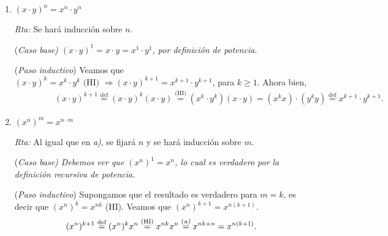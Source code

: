 \documentclass[12pt,spanish,makeidx]{amsbook}
\newcommand{\rta}{\noindent\textit{Rta: }}
\begin{document}
\begin{enumerate}
\begin{enumerate}
				\rta Se fijará $n$ y se hará inducción sobre $m$. 
				
				\noindent(\it Caso  base\rm) Debemos ver que $x^{n}x^1 = x^{n+1}$, lo cual es verdadero por la definición recursiva de potencia. 
				
				\noindent ({\it Paso  inductivo}) Supongamos que el resultado es verdadero para $m=k$, es decir que $x^{n}x^k = a^{n+k}$ (HI). Veamos que  $x^{n}x^{k+1} = x^{n+k+1}$. Ahora bien, 
				\begin{alignat*}2
				x^{n}x^{k+1} &= x^{n}x^{k}x&  & \text{(definición de potencia)} \\
				&= x^{n+k}x& & \text{(HI)} \\
				&= x^{n+k+1}&  & \text{(definición de potencia)}. 
				\end{alignat*}
				\item $(x\cdot y)^n=x^n\cdot y^n$
				
				\rta Se  hará inducción sobre $n$.
				
				\noindent(\it Caso  base\rm) $(x\cdot y)^1=x\cdot y = x^1\cdot y^1$, por definición de potencia. 
				
				\noindent ({\it Paso  inductivo}) Veamos que  $(x\cdot y)^k=x^k\cdot y^k \text{ (HI) } \Rightarrow (x\cdot y)^{k+1}=x^{k+1}\cdot y^{k+1}$, para $k \ge 1$. Ahora bien,
				\begin{multline*}
				\qquad\; \qquad (x\cdot y)^{k+1} \overset{\text{def}}{=} (x\cdot y)^{k} (x\cdot y) \overset{\text{(HI)}}{=} (x^{k}\cdot y^{k}) (x\cdot y) = (x^{k}x)\cdot (y^{k}y) \overset{\text{def}}{=}  x^{k+1}\cdot y^{k+1}.
				\end{multline*}
				
				 
				 
				
				\item $(x^n)^m = x^{n\cdot m}$
				
				\rta Al igual que en \textit{a)}, se fijará $n$ y se hará inducción sobre $m$.
				
				\noindent(\it Caso  base\rm) Debemos ver que $(x^n)^1 = x^n$, lo cual es verdadero por la definición recursiva de potencia. 
				
				\noindent ({\it Paso  inductivo}) Supongamos que el resultado es verdadero para $m=k$, es decir que  $(x^n)^k = x^{nk}$ (HI). Veamos que  $(x^n)^{k+1} = x^{n(k+1)}$. 
				\begin{equation*}
				(x^n)^{k+1}  \overset{\text{def}}{=} (x^n)^{k}x^n
				\overset{\text{(HI)}}{=} x^{nk}x^n
				\overset{\text{(\textit{a)}}}{=} x^{nk+n} 
				= x^{n(k+1)}.  
				\end{equation*} 
			\end{enumerate}
		

\end{enumerate}
\end{document}
